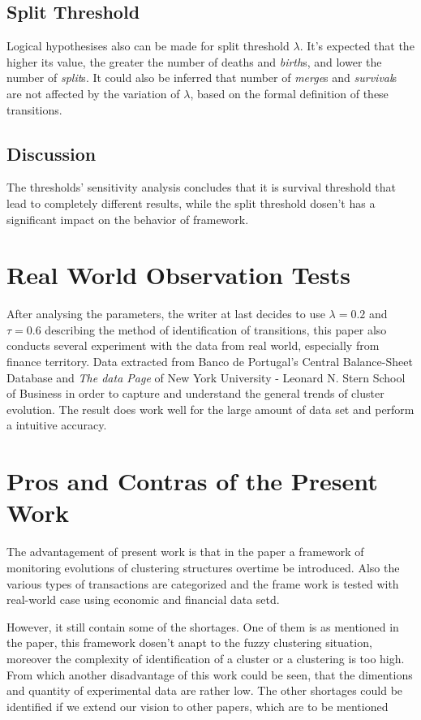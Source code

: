 \documentclass{sig-alternate}
\begin{document}
\subsection{Split Threshold}
Logical hypothesises also can be made for split threshold $\lambda$. It's expected that the higher its value, the greater the number of deaths and \emph{birth}s, and lower the number of \emph{split}s. It could also be inferred that number of \emph{merge}s and \emph{survival}s are not affected by the variation of $\lambda$, based on the formal definition of these transitions.
\subsection{Discussion}
The thresholds' sensitivity analysis concludes that it is survival threshold that lead to completely different results, while the split threshold dosen't has a significant impact on the behavior of framework.

\section{Real World Observation Tests}
After analysing the parameters, the writer at last decides to use $\lambda=0.2$ and $\tau=0.6$ describing the method of identification of transitions, this paper also conducts several experiment with the data from real world, especially from finance territory. Data extracted from Banco de Portugal's Central Balance-Sheet Database and \emph{The data Page} of New York University - Leonard N. Stern School of Business in order to capture and understand the general trends of cluster evolution. The result does work well for the large amount of data set and perform a intuitive accuracy.

\section{Pros and Contras of the Present Work}
The advantagement of present work is that in the paper a framework of monitoring evolutions of clustering structures overtime be introduced. Also the various types of transactions are categorized and the frame work is tested with real-world case using economic and financial data setd.

However, it still contain some of the shortages. One of them is as mentioned in the paper, this framework dosen't anapt to the fuzzy clustering situation, moreover the complexity of identification of a cluster or a clustering is too high. From which another disadvantage of this work could be seen, that the dimentions and quantity of experimental data are rather low. The other shortages could be identified if we extend our vision to other papers, which are to be mentioned
\end{document}
